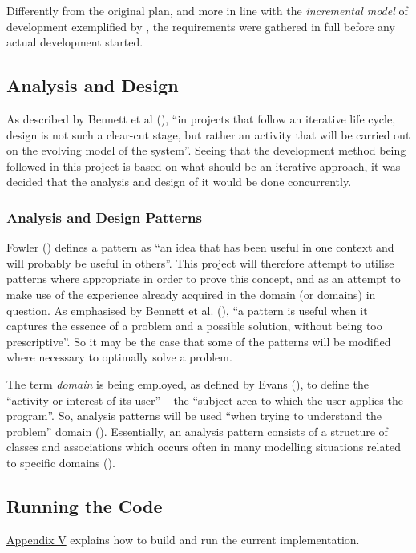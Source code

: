 Differently from the original plan, and more in line with the \emph{incremental
model} of development exemplified by \cite[][pp.~120-124]{dawson2009projects},
the requirements were gathered in full before any actual development started.

\subsection{Analysis and Design} 
As described by Bennett et al (\citeyear[][p.~348]{bennett2010object}), ``in
projects that follow an iterative life cycle, design is not such a clear-cut
stage, but rather an activity that will be carried out on the evolving model of
the system''. Seeing that the development method being followed in this project
is based on what should be an iterative approach, it was decided that the
analysis and design of it would be done concurrently.

\subsubsection{Analysis and Design Patterns}
Fowler (\citeyear[][Section~1.3]{fowler1997analysis}) defines a pattern as ``an
idea that has been useful in one context and will probably be useful in
others''. This project will therefore attempt to utilise patterns where
appropriate in order to prove this concept, and as an attempt to make use of
the experience already acquired in the domain (or domains) in question. As
emphasised by Bennett et al. (\citeyear[][p.~252]{bennett2010object}), ``a
pattern is useful when it captures the essence of a problem and a possible
solution, without being too prescriptive''. So it may be the case that some of
the patterns will be modified where necessary to optimally solve a problem.

The term \emph{domain} is being employed, as defined by Evans
(\citeyear[][p.~2]{evans2004domain}), to define the ``activity or interest of
its user'' -- the ``subject area to which the user applies the program''.  
So, analysis patterns will be used ``when trying to understand the problem'' domain
(\cite[][Section~1.1]{fowler1997analysis}). Essentially, an analysis pattern
consists of a structure of classes and associations which occurs often in many
modelling situations related to specific domains
(\cite[][p.~254]{bennett2010object}).

\subsection{Running the Code}
\hyperref[appendix5]{Appendix V} explains how to build and run the current
implementation.
